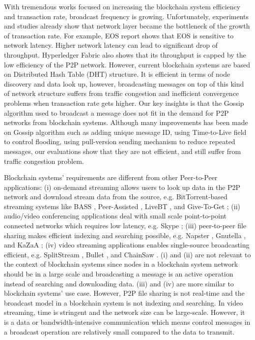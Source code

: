 With tremendous works focused on increasing the blockchain system efficiency and transaction rate, broadcast frequency is growing. Unfortunately, experiments and studies \cite{cachin2016architecture, xueos} already show that network layer became the bottleneck of the growth of transaction rate. For example, EOS report \cite{xueos} shows that EOS is sensitive to network latency. Higher network latency can lead to significant drop of throughput. Hyperledger Fabric \cite{cachin2016architecture} also shows that its throughput is capped by the low efficiency of the P2P network. However, current blockchain systems are based on Distributed Hash Table (DHT) structure. It is efficient in terms of node discovery and data look up, however, broadcasting messages on top of this kind of network structure suffers from traffic congestion and inefficient convergence problems when transaction rate gets higher. Our key insights is that the Gossip algorithm used to broadcast a message does not fit in the demand for P2P networks from blockchain systems. Although many improvements has been made on Gossip algorithm such as adding unique message ID, using Time-to-Live field to control flooding, using pull-version sending mechanism to reduce repeated messages, our evaluations show that they are not efficient, and still suffer from traffic congestion problem. 

Blockchain systems' requirements are different from other Peer-to-Peer applications: (i) on-demand streaming allows users to look up data in the P2P network and download stream data from the source, e.g. BitTorrent-based streaming systems like BASS \cite{dana2005bass}, Peer-Assisted \cite{carlsson2007peer}, LiveBT \cite{lv2007livebt}, and Give-To-Get \cite{mol2008give}; (ii) audio/video conferencing applications deal with small scale point-to-point connected networks which requires low latency, e.g. Skype \cite{baset2004analysis}; (iii) peer-to-peer file sharing makes efficient indexing and searching possible, e.g. Napster \cite{saroiu2003measuring}, Gnutella \cite{ripeanu2001peer}, and KaZaA \cite{good2003usability}; (iv) video streaming applications enables single-source broadcasting efficient, e.g. SplitStream \cite{castro2003splitstream}, Bullet \cite{kostic2003bullet}, and ChainSaw \cite{pai2005chainsaw}. (i) and (ii) are not relevant to the context of blockchain systems since nodes in a blockchain system network should be in a large scale and broadcasting a message is an active operation instead of searching and downloading data. (iii) and (iv) are more similar to blockchain systems' use case. However, P2P file sharing is not real-time and the broadcast model in a blockchain system is not indexing and searching. In video streaming, time is stringent and the network size can be large-scale. However, it is a data or bandwidth-intensive communication which means control messages in a broadcast operation are relatively small compared to the data to transmit.

